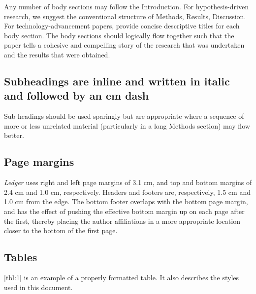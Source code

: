 \documentclass{ledger}
\begin{document}
Any number of body sections may follow the Introduction.  For hypothesis-driven research, we suggest the conventional structure of Methods, Results, Discussion.  For technology-advancement papers, provide concise descriptive titles for each body section.  The body sections should logically flow together such that the paper tells a cohesive and compelling story of the research that was undertaken and the results that were obtained.

\subsection{Subheadings are inline and written in italic and followed by an em dash}

Sub headings should be used sparingly but are appropriate where a sequence of more or less unrelated material (particularly in a long Methods section) may flow better.

\subsection{Page margins}

\emph{Ledger} uses right and left page margins of 3.1 cm, and top and bottom margins of 2.4 cm and 1.0 cm, respectively.  Headers and footers are, respectively, 1.5 cm and 1.0 cm from the edge.  The bottom footer overlaps with the bottom page margin, and has the effect of pushing the effective bottom margin up on each page after the first, thereby placing the author affiliations in a more appropriate location closer to the bottom of the first page.

\subsection{Tables}

\cref{tbl:1} is an example of a properly formatted table.  It also describes the styles used in this document.
\end{document}

